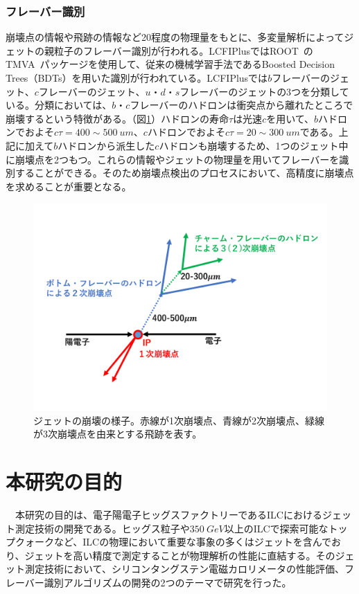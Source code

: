 \subsubsection{フレーバー識別}
崩壊点の情報や飛跡の情報など20程度の物理量をもとに、多変量解析によってジェットの親粒子のフレーバー識別が行われる。LCFIPlusではROOT~\cite{root}のTMVA~\cite{tmva}パッケージを使用して、従来の機械学習手法であるBoosted Decision Trees（BDTs）を用いた識別が行われている。LCFIPlusでは$b$フレーバーのジェット、$c$フレーバーのジェット、$u$・$d$・$s$フレーバーのジェットの3つを分類している。分類においては、$b$・$c$フレーバーのハドロンは衝突点から離れたところで崩壊するという特徴がある。（図\ref{bcjets}）ハドロンの寿命$\tau$は光速$c$を用いて、$b$ハドロンでおよそ$c\tau = 400 \sim \SI{500}{um}$、$c$ハドロンでおよそ$c\tau = 20 \sim \SI{300}{um}$である。上記に加えて$b$ハドロンから派生した$c$ハドロンも崩壊するため、1つのジェット中に崩壊点を2つもつ。これらの情報やジェットの物理量を用いてフレーバーを識別することができる。そのため崩壊点検出のプロセスにおいて、高精度に崩壊点を求めることが重要となる。
\begin{figure}[H]
	\begin{center}
 \includegraphics[keepaspectratio, scale=0.4]
 	{Figure/Introduction/bcjets.pdf}
 		\caption[ジェット崩壊の様子]{ジェットの崩壊の様子。赤線が1次崩壊点、青線が2次崩壊点、緑線が3次崩壊点を由来とする飛跡を表す。}
 		\label{bcjets}
	\end{center}
\end{figure}
\section{本研究の目的}
　本研究の目的は、電子陽電子ヒッグスファクトリーであるILCにおけるジェット測定技術の開発である。ヒッグス粒子や$\SI{350}{GeV}$以上のILCで探索可能なトップクォークなど、ILCの物理において重要な事象の多くはジェットを含んでおり、ジェットを高い精度で測定することが物理解析の性能に直結する。そのジェット測定技術において、シリコンタングステン電磁カロリメータの性能評価、フレーバー識別アルゴリズムの開発の2つのテーマで研究を行った。\\
